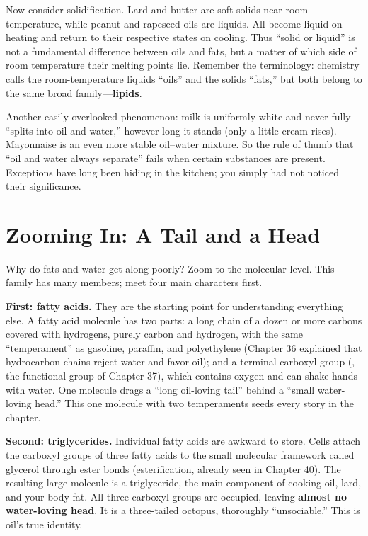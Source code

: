 Now consider solidification. Lard and butter are soft solids near room temperature, while peanut and rapeseed oils are liquids. All become liquid on heating and return to their respective states on cooling. Thus ``solid or liquid'' is not a fundamental difference between oils and fats, but a matter of which side of room temperature their melting points lie. Remember the terminology: chemistry calls the room-temperature liquids ``oils'' and the solids ``fats,'' but both belong to the same broad family---\textbf{lipids}.

Another easily overlooked phenomenon: milk is uniformly white and never fully ``splits into oil and water,'' however long it stands (only a little cream rises). Mayonnaise is an even more stable oil--water mixture. So the rule of thumb that ``oil and water always separate'' fails when certain substances are present. Exceptions have long been hiding in the kitchen; you simply had not noticed their significance.

\section{Zooming In: A Tail and a Head}

Why do fats and water get along poorly? Zoom to the molecular level. This family has many members; meet four main characters first.

\textbf{First: fatty acids.} They are the starting point for understanding everything else. A fatty acid molecule has two parts: a long chain of a dozen or more carbons covered with hydrogens, purely carbon and hydrogen, with the same ``temperament'' as gasoline, paraffin, and polyethylene (Chapter 36 explained that hydrocarbon chains reject water and favor oil); and a terminal carboxyl group (, the functional group of Chapter 37), which contains oxygen and can shake hands with water. One molecule drags a ``long oil-loving tail'' behind a ``small water-loving head.'' This one molecule with two temperaments seeds every story in the chapter.

\textbf{Second: triglycerides.} Individual fatty acids are awkward to store. Cells attach the carboxyl groups of three fatty acids to the small molecular framework called glycerol through ester bonds (esterification, already seen in Chapter 40). The resulting large molecule is a triglyceride, the main component of cooking oil, lard, and your body fat. All three carboxyl groups are occupied, leaving \textbf{almost no water-loving head}. It is a three-tailed octopus, thoroughly ``unsociable.'' This is oil's true identity.

